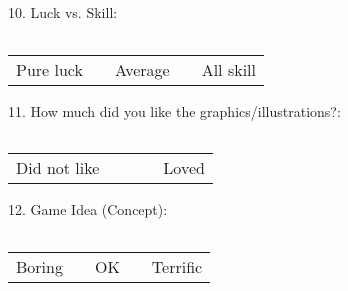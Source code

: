 10. Luck vs. Skill:
\begin{center}
 	\begin{tabular}{| p{1cm} | p{1cm} | p{1cm} | p{1cm} | p{1cm} |}
    	\hline
     	&  &  &  &  \\ \hline
  	\end{tabular}
\end{center}
\begin{center}
	\begin{tabular}{ >{\centering\arraybackslash}p{1cm}  >{\centering\arraybackslash}p{1cm}  >{\centering\arraybackslash}p{1cm}  >{\centering\arraybackslash}p{1cm}  >{\centering\arraybackslash}p{1cm} }
    Pure luck &  & Average &  & All skill \\ 
 	\end{tabular}
\end{center}

11. How much did you like the graphics/illustrations?:
\begin{center}
 	\begin{tabular}{| p{1cm} | p{1cm} | p{1cm} | p{1cm} | p{1cm} |}
    	\hline
     	&  &  &  &  \\ \hline
  	\end{tabular}
\end{center}
\begin{center}
	\begin{tabular}{ >{\centering\arraybackslash}p{1cm}  >{\centering\arraybackslash}p{1cm}  >{\centering\arraybackslash}p{1cm}  >{\centering\arraybackslash}p{1cm}  >{\centering\arraybackslash}p{1cm} }
    Did not like &  &  &  & Loved \\ 
 	\end{tabular}
\end{center}

12. Game Idea (Concept):
\begin{center}
 	\begin{tabular}{| p{1cm} | p{1cm} | p{1cm} | p{1cm} | p{1cm} |}
    	\hline
     	&  &  &  &  \\ \hline
  	\end{tabular}
\end{center}
\begin{center}
	\begin{tabular}{ >{\centering\arraybackslash}p{1cm}  >{\centering\arraybackslash}p{1cm}  >{\centering\arraybackslash}p{1cm}  >{\centering\arraybackslash}p{1cm}  >{\centering\arraybackslash}p{1cm} }
    Boring &  & OK &  & Terrific \\ 
 	\end{tabular}
\end{center}


